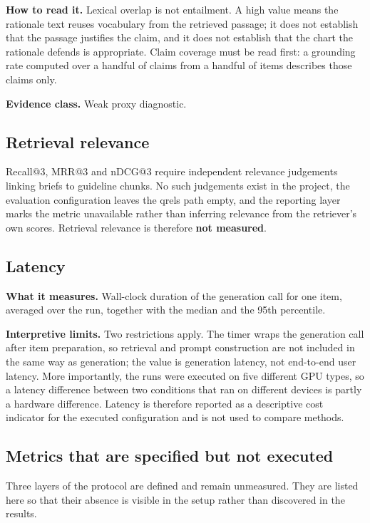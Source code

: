 \textbf{How to read it.} Lexical overlap is not entailment. A high value means the rationale text reuses vocabulary from the retrieved passage; it does not establish that the passage justifies the claim, and it does not establish that the chart the rationale defends is appropriate. Claim coverage must be read first: a grounding rate computed over a handful of claims from a handful of items describes those claims only.

\textbf{Evidence class.} Weak proxy diagnostic.

\subsection{Retrieval relevance}

Recall@3, MRR@3 and nDCG@3 require independent relevance judgements linking briefs to guideline chunks. No such judgements exist in the project, the evaluation configuration leaves the qrels path empty, and the reporting layer marks the metric unavailable rather than inferring relevance from the retriever's own scores. Retrieval relevance is therefore \textbf{not measured}.

\subsection{Latency}

\textbf{What it measures.} Wall-clock duration of the generation call for one item, averaged over the run, together with the median and the 95th percentile.

\textbf{Interpretive limits.} Two restrictions apply. The timer wraps the generation call after item preparation, so retrieval and prompt construction are not included in the same way as generation; the value is generation latency, not end-to-end user latency. More importantly, the runs were executed on five different GPU types, so a latency difference between two conditions that ran on different devices is partly a hardware difference. Latency is therefore reported as a descriptive cost indicator for the executed configuration and is not used to compare methods.

\subsection{Metrics that are specified but not executed}

Three layers of the protocol are defined and remain unmeasured. They are listed here so that their absence is visible in the setup rather than discovered in the results.

